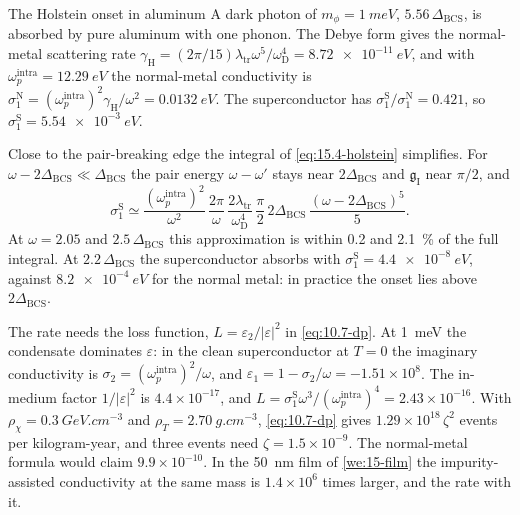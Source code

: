 \begin{workedexample}{The Holstein onset in aluminum}\label{we:15-holstein}
A dark photon of $m_\phi = \SI{1}{meV}$, $5.56\,\Delta_{\mathrm{BCS}}$, is absorbed by pure aluminum with one phonon. The Debye form gives the normal-metal scattering rate $\gamma_{\mathrm{H}} = (2\pi/15)\lambda_{\mathrm{tr}}\omega^5/\omega_{\mathrm{D}}^4 = \SI{8.72e-11}{eV}$, and with $\omega_p^{\mathrm{intra}} = \SI{12.29}{eV}$ the normal-metal conductivity is $\sigma_1^{\mathrm{N}} = (\omega_p^{\mathrm{intra}})^2\gamma_{\mathrm{H}}/\omega^2 = \SI{0.0132}{eV}$. The superconductor has $\sigma_1^{\mathrm{S}}/\sigma_1^{\mathrm{N}} = 0.421$, so $\sigma_1^{\mathrm{S}} = \SI{5.54e-3}{eV}$.

Close to the pair-breaking edge the integral of \cref{eq:15.4-holstein} simplifies. For $\omega - 2\Delta_{\mathrm{BCS}} \ll \Delta_{\mathrm{BCS}}$ the pair energy $\omega - \omega'$ stays near $2\Delta_{\mathrm{BCS}}$ and $\mathfrak{g}_{\mathrm{I}}$ near $\pi/2$, and
\begin{equation*}
  \sigma_1^{\mathrm{S}} \simeq \frac{(\omega_p^{\mathrm{intra}})^2}{\omega^2}\,\frac{2\pi}{\omega}\,\frac{2\lambda_{\mathrm{tr}}}{\omega_{\mathrm{D}}^4}\,\frac{\pi}{2}\,2\Delta_{\mathrm{BCS}}\,\frac{(\omega - 2\Delta_{\mathrm{BCS}})^5}{5} .
\end{equation*}
At $\omega = 2.05$ and $2.5\,\Delta_{\mathrm{BCS}}$ this approximation is within 0.2 and \SI{2.1}{\percent} of the full integral. At $2.2\,\Delta_{\mathrm{BCS}}$ the superconductor absorbs with $\sigma_1^{\mathrm{S}} = \SI{4.4e-8}{eV}$, against $\SI{8.2e-4}{eV}$ for the normal metal: in practice the onset lies above $2\Delta_{\mathrm{BCS}}$.

The rate needs the loss function, $L = \varepsilon_2/|\varepsilon|^2$ in \cref{eq:10.7-dp}. At \SI{1}{meV} the condensate dominates $\varepsilon$: in the clean superconductor at $T = 0$ the imaginary conductivity is $\sigma_2 = (\omega_p^{\mathrm{intra}})^2/\omega$, and $\varepsilon_1 = 1 - \sigma_2/\omega = -1.51\times10^8$. The in-medium factor $1/|\varepsilon|^2$ is $4.4\times10^{-17}$, and $L = \sigma_1^{\mathrm{S}}\omega^3/(\omega_p^{\mathrm{intra}})^4 = 2.43\times10^{-16}$. With $\rho_\chi = \SI{0.3}{GeV.cm^{-3}}$ and $\rho_T = \SI{2.70}{g.cm^{-3}}$, \cref{eq:10.7-dp} gives $1.29\times10^{18}\,\zeta^2$ events per kilogram-year, and three events need $\zeta = 1.5\times10^{-9}$. The normal-metal formula would claim $9.9\times10^{-10}$. In the \SI{50}{nm} film of \cref{we:15-film} the impurity-assisted conductivity at the same mass is $1.4\times10^6$ times larger, and the rate with it.
\end{workedexample}


